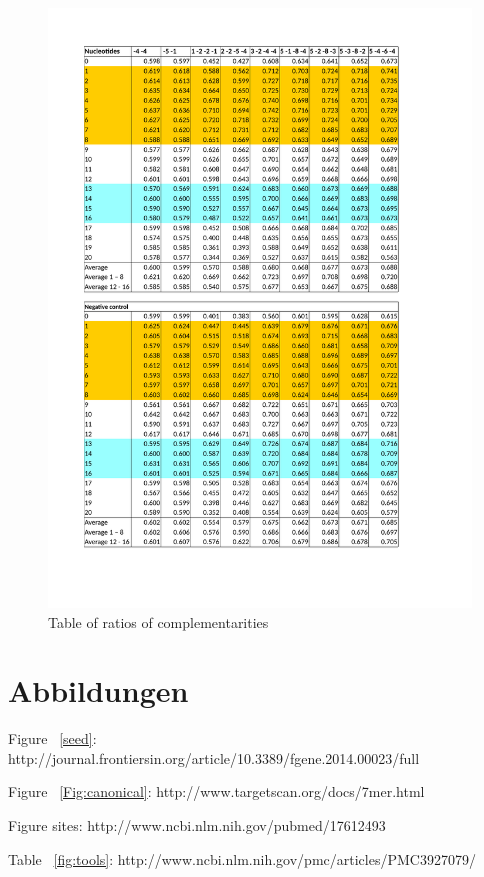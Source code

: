 \documentclass[12pt]{article}
\begin{document}
\begin{figure}
\label{table:ratios}
\vspace{-3cm}
\includegraphics[scale=0.8]{results/ratio_table.pdf}
\vspace{-2.8cm}
\caption{Table of ratios of complementarities}
\end{figure}

\newpage



\section{Abbildungen}
Figure ~\ref{seed}: http://journal.frontiersin.org/article/10.3389/fgene.2014.00023/full

Figure ~\ref{Fig:canonical}: http://www.targetscan.org/docs/7mer.html

Figure sites: http://www.ncbi.nlm.nih.gov/pubmed/17612493

Table ~\ref{fig:tools}: http://www.ncbi.nlm.nih.gov/pmc/articles/PMC3927079/
\end{document}
